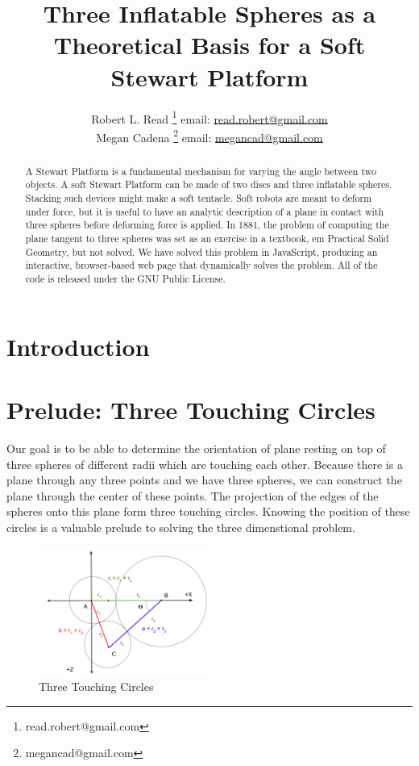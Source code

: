 \documentclass{article}
\title{Three Inflatable Spheres as a Theoretical Basis for a Soft Stewart Platform}
\author{Robert L. Read
  \thanks{read.robert@gmail.com}
  email: \href{mailto:read.robert@gmail.com}{read.robert@gmail.com}\\
Megan Cadena
  \thanks{megancad@gmail.com}
  email: \href{mailto:megancad@gmail.com}{megancad@gmail.com}
  }
\begin{document}
\maketitle
\begin{abstract}
  A Stewart Platform\cite{wiki:stewart} is a fundamental mechanism for varying the angle
  between two objects.
  A soft Stewart Platform can be made of two discs and
  three inflatable spheres.
  Stacking such devices might make a soft tentacle.
  Soft robots are meant to deform under force, but it is useful to have
  an analytic description of a plane in contact with three spheres
  before deforming force is applied.
  In 1881, the problem of computing the plane tangent to three spheres was
  set as an exercise in a textbook, {em Practical Solid Geometry}\cite{payne1881},
  but not solved.
  We have solved this problem in JavaScript, producing an interactive,
  browser-based web page that dynamically solves the problem\cite{softrobotcalc}.
  All of the code is released under the GNU Public License.
\end{abstract}


\section{Introduction}


\section{Prelude: Three Touching Circles}

Our goal is to be able to determine the orientation of plane resting
on top of three spheres of different radii which are touching each
other.
Because there is a plane through any three points and we have three spheres, we can construct the plane through
the center of these points.
The projection of the edges of the spheres onto this plane form three touching circles.
Knowing the position of these circles is a valuable prelude to solving the three dimenstional problem.

\begin{figure}
     \centering
     \includegraphics[width=0.5\textwidth]{figures/ThreeTouchingCircles.png}
     \caption{Three Touching Circles}
  \label{fig:Tangent}
\end{figure}
\end{document}
